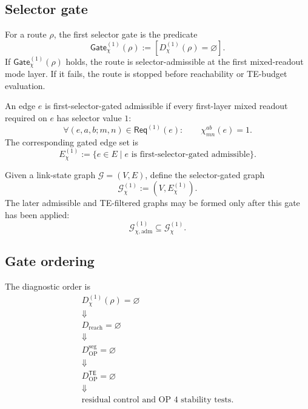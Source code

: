 \subsection{Selector gate}
\label{subsec:v410r22-selector-gate}

\begin{definition}
\label{def:v410r22-first-selector-gate}
For a route \(\rho\), the first selector gate is the predicate
\[
 \mathsf{Gate}_{\chi}^{(1)}(\rho)
 :=
 [D_{\chi}^{(1)}(\rho)=\varnothing].
\]
If \(\mathsf{Gate}_{\chi}^{(1)}(\rho)\) holds, the route is selector-admissible
at the first mixed-readout mode layer. If it fails, the route is stopped before
reachability or TE-budget evaluation.
\end{definition}

\begin{definition}
\label{def:v410r22-selector-gated-admissible-edge}
An edge \(e\) is first-selector-gated admissible if every first-layer mixed
readout required on \(e\) has selector value \(1\):
\[
 \forall (e,a,b;m,n)\in\mathsf{Req}^{(1)}(e):
 \qquad
 \chi^{ab}_{mn}(e)=1.
\]
The corresponding gated edge set is
\[
 E_{\chi}^{(1)}
 :=
 \{e\in E\mid e\text{ is first-selector-gated admissible}\}.
\]
\end{definition}

\begin{definition}
\label{def:v410r22-selector-gated-graph}
Given a link-state graph \(\mathcal G=(V,E)\), define the selector-gated graph
\[
 \mathcal G_{\chi}^{(1)}
 :=
 (V,E_{\chi}^{(1)}).
\]
The later admissible and TE-filtered graphs may be formed only after this gate
has been applied:
\[
 \mathcal G_{\chi,\mathrm{adm}}^{(1)}
 \subseteq
 \mathcal G_{\chi}^{(1)}.
\]
\end{definition}

\subsection{Gate ordering}
\label{subsec:v410r22-gate-ordering}

\begin{definition}
\label{def:v410r22-op-diagnostic-order-after-r22}
The diagnostic order is
\[
\begin{array}{c}
D_{\chi}^{(1)}(\rho)=\varnothing\\
\Downarrow\\
D_{\mathrm{reach}}=\varnothing\\
\Downarrow\\
D_{\mathrm{OP}}^{\mathrm{seg}}=\varnothing\\
\Downarrow\\
D_{\mathrm{OP}}^{\mathsf{TE}}=\varnothing\\
\Downarrow\\
\text{residual control and OP~4 stability tests.}
\end{array}
\]
\end{definition}

